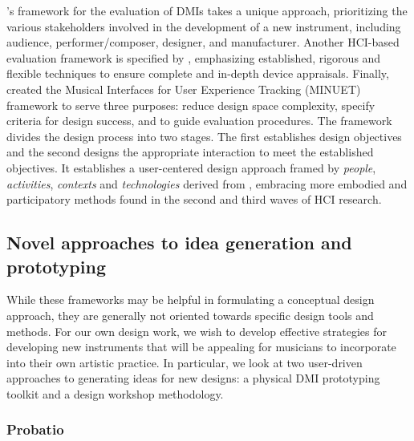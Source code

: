 \documentclass[]{interact}
\theoremstyle{plain}%
\theoremstyle{definition}
\theoremstyle{remark}
\begin{document}
\citeauthor{OModhrain2011a}'s framework for the evaluation of DMIs \citep*{OModhrain2011a} takes a unique approach, prioritizing the various stakeholders involved in the development of a new instrument, including audience, performer/composer, designer, and manufacturer. Another HCI-based evaluation framework is specified by \citet{Young2015a}, emphasizing established, rigorous and flexible techniques to ensure complete and in-depth device appraisals. Finally, \citet{fmorreale:2014} created the Musical Interfaces for User Experience Tracking (MINUET) framework to serve three purposes: reduce design space complexity, specify criteria for design success, and to guide evaluation procedures. The framework divides the design process into two stages. The first establishes design objectives and the second designs the appropriate interaction to meet the established objectives. It establishes a user-centered design approach framed by \emph{people}, \emph{activities}, \emph{contexts} and \emph{technologies} derived from \citet{Benyon2005}, embracing more embodied and participatory methods found in the second and third waves of HCI research.

\subsection{Novel approaches to idea generation and prototyping}
\label{ch3-sec:novel-approaches-to-idea-generation-and-prototyping}

While these frameworks may be helpful in formulating a conceptual design approach, they are generally not oriented towards specific design tools and methods. For our own design work, we wish to develop effective strategies for developing new instruments that will be appealing for musicians to incorporate into their own artistic practice. In particular, we look at two user-driven approaches to generating ideas for new designs: a physical DMI prototyping toolkit and a design workshop methodology. 

\subsubsection{Probatio}
\label{ch3-sec:probatio}
\end{document}
